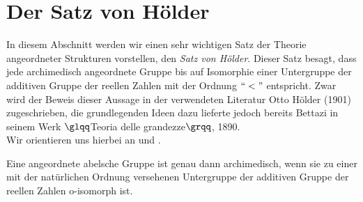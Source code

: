 \section{Der Satz von Hölder}
In diesem Abschnitt werden wir einen sehr wichtigen Satz der Theorie angeordneter Strukturen vorstellen, den \textit{Satz von Hölder}. Dieser Satz besagt, dass jede archimedisch angeordnete Gruppe bis auf Isomorphie einer Untergruppe der additiven Gruppe der reellen Zahlen mit der Ordnung $``< "$ entspricht. Zwar wird der Beweis dieser Aussage in der verwendeten Literatur Otto Hölder (1901)\cite{hoelder1901} zugeschrieben, die grundlegenden Ideen dazu lieferte jedoch bereits Bettazi in seinem Werk $\glqq$Teoria delle grandezze$\grqq$, 1890\cite[S. 578]{Lueneburg08}.\\
Wir orientieren uns hierbei an \cite{hoelder1901} und \cite{priesscrampe83}. 
\begin{satz}\label{aga} %
Eine angeordnete abelsche Gruppe ist genau dann archimedisch, wenn sie zu einer mit der natürlichen Ordnung versehenen Untergruppe der additiven Gruppe der reellen Zahlen o-isomorph ist.
\end{satz}
%
%

